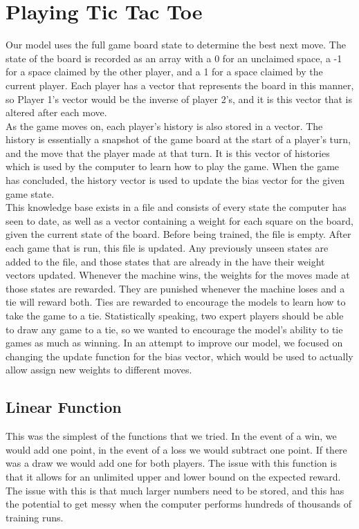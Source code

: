 \documentclass{article}
\begin{document}
\section{Playing Tic Tac Toe}
Our model uses the full game board state to determine the best next move. The state of the board is recorded as an array with a 0 for an unclaimed space, a -1 for a space claimed by the other player, and a 1 for a space claimed by the current player. Each player has a vector that represents the board in this manner, so Player 1's vector would be the inverse of player 2's, and it is this vector that is altered after each move. \\
As the game moves on, each player's history is also stored in a vector. The history is essentially a snapshot of the game board at the start of a player's turn, and the move that the player made at that turn. It is this vector of histories which is used by the computer to learn how to play the game. When the game has concluded, the history vector is used to update the bias vector for the given game state. \\
This knowledge base exists in a file and consists of every state the computer has seen to date, as well as a vector containing a weight for each square on the board, given the current state of the board. Before being trained, the file is empty. After each game that is run, this file is updated. Any previously unseen states are added to the file, and those states that are already in the have their weight vectors updated. Whenever the machine wins, the weights for the moves made at those states are rewarded. They are punished whenever the machine loses and a tie will reward both. Ties are rewarded to encourage the models to learn how to take the game to a tie. Statistically speaking, two expert players should be able to draw any game to a tie, so we wanted to encourage the model's ability to tie games as much as winning. In an attempt to improve our model, we focused on changing the update function for the bias vector, which would be used to actually allow assign new weights to different moves.  

\subsection{Linear Function}
This was the simplest of the functions that we tried. In the event of a win, we would add one point, in the event of a loss we would subtract one point. If there was a draw we would add one for both players. The issue with this function is that it allows for an unlimited upper and lower bound on the expected reward. The issue with this is that much larger numbers need to be stored, and this has the potential to get messy when the computer performs hundreds of thousands of training runs.
\end{document}
